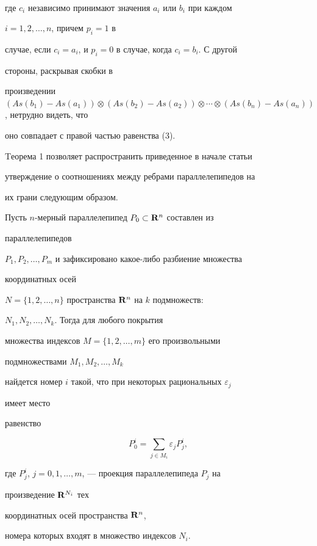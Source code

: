 \begin{pf}
\begin{multline}
\end{multline} 


где $c_i$ независимо принимают значения $a_i$ или $b_i$ при каждом 


$i=1,2,\dotsc,n$, причем $p_i=1$ в  


случае, если $c_i=a_i$, и $p_i=0$ в случае, когда $c_i=b_i$. С другой 


стороны, раскрывая скобки в  


произведении $(As(b_1)-As(a_1))\otimes (As(b_2)-As(a_2))\otimes 


\dotsb\otimes (As(b_n)-As(a_n))$, нетрудно видеть, что  


оно совпадает с правой частью равенства (3). 


\end{pf} 


 


Tеорема 1 позволяет распространить приведенное в начале статьи  


утверждение о соотношениях между ребрами параллелепипедов на  


их грани следующим образом. 


 


\begin{thm} 


Пусть $n$-мерный параллелепипед $P_0\subset\bold R^n$ составлен из 


параллелепипедов 


$P_1,P_2,\dotsc,P_m$ и зафиксировано какое-либо разбиение множества 


координатных осей 


$N=\{1,2,\dotsc,n\}$ пространства $\bold R^n$ на $k$ подмножеств\/$:$ 


$N_1,N_2,\dotsc,N_k$. Тогда для любого покрытия  


множества индексов $M=\{1,2,\dotsc,m\}$ его произвольными 


подмножествами $M_1,M_2,\dotsc,M_k$ 


найдется номер $i$ такой, что при некоторых рациональных $\varepsilon_j$ 


имеет место  


равенство 


\begin{equation} 


P^i_0=\sum_{j\in M_i}\varepsilon_j P^i_j, 


\end{equation} 


где $P^i_j$, $j=0,1,\dotsc,m$, --- проекция параллелепипеда $P_j$ на 


произведение $\bold R^{N_i}$ тех  


координатных осей пространства $\bold R^n$, 


номера которых входят в множество индексов $N_i$.  


\end{thm} 


